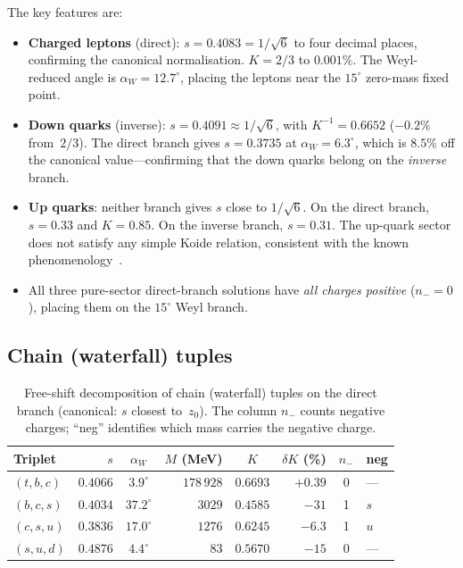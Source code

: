 \documentclass[preprint,12pt]{elsarticle}
\begin{document}
\noindent The key features are:
\begin{itemize}
\item \textbf{Charged leptons} (direct): $s = 0.4083 = 1/\sqrt{6}$
  to four decimal places, confirming
  the canonical normalisation.  $K = 2/3$ to $0.001\%$.
  The Weyl-reduced angle is $\alpha_W = 12.7^\circ$,
  placing the leptons near the $15^\circ$ zero-mass fixed point.

\item \textbf{Down quarks} (inverse): $s = 0.4091 \approx 1/\sqrt{6}$,
  with $K^{-1} = 0.6652$ ($-0.2\%$ from~$2/3$).
  The direct branch gives $s = 0.3735$ at $\alpha_W = 6.3^\circ$,
  which is $8.5\%$ off the canonical value---confirming that
  the down quarks belong on the \emph{inverse} branch.

\item \textbf{Up quarks}: neither branch gives $s$ close to $1/\sqrt{6}$.
  On the direct branch, $s = 0.33$ and $K = 0.85$.
  On the inverse branch, $s = 0.31$.  The up-quark sector does not
  satisfy any simple Koide relation, consistent with the known
  phenomenology~\cite{waterfall}.

\item All three pure-sector direct-branch solutions have
  \emph{all charges positive} ($n_- = 0$), placing them on the
  $15^\circ$ Weyl branch.
\end{itemize}


\subsection{Chain (waterfall) tuples}

\begin{table}[h]
\centering
\caption{Free-shift decomposition of chain (waterfall) tuples
on the direct branch (canonical: $s$ closest to~$z_0$).
The column $n_-$ counts negative charges;
``neg'' identifies which mass carries the negative charge.}
\label{tab:chain}
{\small
\begin{tabular}{lrcrcrcl}
\toprule
Triplet & $s$ & $\alpha_W$ & $M$ (MeV) & $K$ & $\delta K$ (\%) & $n_-$ & neg \\
\midrule
$(t, b, c)$   & $0.4066$ & $3.9^\circ$   & $178\,928$ & $0.6693$ & $+0.39$ & 0 & --- \\
$(b, c, s)$   & $0.4034$ & $37.2^\circ$  & $3029$     & $0.4585$ & $-31$   & 1 & $s$ \\
$(c, s, u)$   & $0.3836$ & $17.0^\circ$  & $1276$     & $0.6245$ & $-6.3$  & 1 & $u$ \\
$(s, u, d)$   & $0.4876$ & $4.4^\circ$   & $83$       & $0.5670$ & $-15$   & 0 & --- \\
\bottomrule
\end{tabular}}
\end{table}
\end{document}
